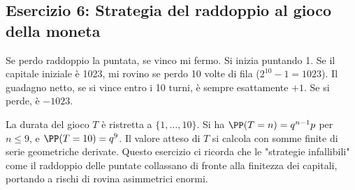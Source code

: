 \subsection*{Esercizio 6: Strategia del raddoppio al gioco della moneta}
Se perdo raddoppio la puntata, se vinco mi fermo. Si inizia puntando 1. Se il capitale iniziale è 1023, mi rovino se perdo 10 volte di fila ($2^{10}-1 = 1023$).
Il guadagno netto, se si vince entro i 10 turni, è sempre esattamente $+1$. Se si perde, è $-1023$.
\begin{spiegazione}
La durata del gioco $T$ è ristretta a $\{1, \dots, 10\}$. Si ha $\PP(T=n) = q^{n-1}p$ per $n \le 9$, e $\PP(T=10) = q^9$.
Il valore atteso di $T$ si calcola con somme finite di serie geometriche derivate.
Questo esercizio ci ricorda che le "strategie infallibili" come il raddoppio delle puntate collassano di fronte alla finitezza dei capitali, portando a rischi di rovina asimmetrici enormi.
\end{spiegazione}
